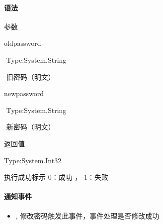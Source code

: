 \documentclass[letterpaper,10pt,english]{sphinxmanual}
\begin{document}
\paragraph{语法}
\label{\detokenize{csharp_activex:id32}}
%
\begin{sphinxVerbatim}[commandchars=\\\{\}]
     
\end{sphinxVerbatim}

参数

oldpassword

​ Type:System.String

​ 旧密码（明文）

newpassword

​ Type:System.String

​ 新密码（明文）

返回值

Type:System.Int32

执行成功标示 0：成功 ，-1：失败


\paragraph{通知事件}
\label{\detokenize{csharp_activex:id33}}\begin{itemize}
\item {} 
 ,
修改密码触发此事件，事件处理是否修改成功

\end{itemize}
\end{document}
